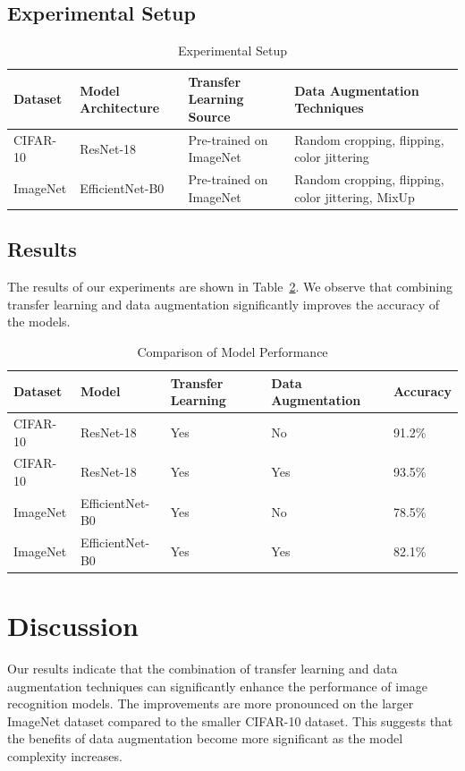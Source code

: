 \documentclass{article}
\begin{document}
\subsection{Experimental Setup}
\label{subsec:experimental_setup}
\begin{table}[ht]
    \centering
    \begin{tabularx}{\linewidth}{|X|X|X|X|}
        \hline
        Dataset & Model Architecture & Transfer Learning Source & Data Augmentation Techniques \\
        \hline
        CIFAR-10 & ResNet-18 & Pre-trained on ImageNet & Random cropping, flipping, color jittering \\
        \hline
        ImageNet & EfficientNet-B0 & Pre-trained on ImageNet & Random cropping, flipping, color jittering, MixUp \\
        \hline
    \end{tabularx}
    \caption{Experimental Setup}
    \label{tab:experimental_setup}
\end{table}

\subsection{Results}
\label{subsec:results}
The results of our experiments are shown in Table~\ref{tab:results}. We observe that combining transfer learning and data augmentation significantly improves the accuracy of the models.

\begin{table}[ht]
    \centering
    \begin{tabularx}{\linewidth}{|X|X|X|X|X|}
        \hline
        Dataset & Model & Transfer Learning & Data Augmentation & Accuracy \\
        \hline
        CIFAR-10 & ResNet-18 & Yes & No & 91.2\% \\
        \hline
        CIFAR-10 & ResNet-18 & Yes & Yes & 93.5\% \\
        \hline
        ImageNet & EfficientNet-B0 & Yes & No & 78.5\% \\
        \hline
        ImageNet & EfficientNet-B0 & Yes & Yes & 82.1\% \\
        \hline
    \end{tabularx}
    \caption{Comparison of Model Performance}
    \label{tab:results}
\end{table}

\section{Discussion}
\label{sec:discussion}
Our results indicate that the combination of transfer learning and data augmentation techniques can significantly enhance the performance of image recognition models. The improvements are more pronounced on the larger ImageNet dataset compared to the smaller CIFAR-10 dataset. This suggests that the benefits of data augmentation become more significant as the model complexity increases.
\end{document}
